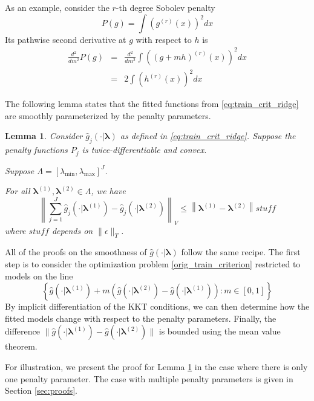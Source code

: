\documentclass[12pt]{article}
\newtheorem{lemma}{Lemma}
\begin{document}
As an example, consider the $r$-th degree Sobolev penalty
\begin{equation}
P(g) = \int \left(g^{(r)}(x) \right)^2 dx
\end{equation}
Its pathwise second derivative at $g$ with respect to $h$ is
\begin{eqnarray}
\frac{d^2}{dm^2} P(g) &=& \frac{d^2}{dm^2} \int \left((g + mh)^{(r)}(x) \right)^2 dx\\
&=& 2 \int \left(h^{(r)}(x) \right)^2 dx
\end{eqnarray}

The following lemma states that the fitted functions from \ref{eq:train_crit_ridge} are smoothly parameterized by the penalty parameters.

\begin{lemma}
\label{lemma:nonparam_smooth}
Consider $\hat{g}_{j}(\cdot| \boldsymbol \lambda)$ as defined in \ref{eq:train_crit_ridge}.
Suppose the penalty functions $P_{j}$ is twice-differentiable and convex.

Suppose $\Lambda = [\lambda_{\min}, \lambda_{\max}]^J$.

For all $\boldsymbol \lambda^{(1)}, \boldsymbol \lambda^{(2)} \in \Lambda$, we have
\[
\left \|
\sum_{j=1}^{J}\hat{g}_{j}(\cdot| \boldsymbol \lambda^{(1)})-\hat{g}_{j}(\cdot| \boldsymbol \lambda^{(2)})
\right \|_{V}
\le
\left \|
\boldsymbol \lambda^{(1)}- \boldsymbol \lambda^{(2)}
\right \|
stuff
\]
where $stuff$ depends on $\| \epsilon \|_T$.
\end{lemma}

All of the proofs on the smoothness of $\hat{g}(\cdot | \boldsymbol \lambda)$ follow the same recipe. The first step is to consider the optimization problem \eqref{orig_train_criterion} restricted to models on the line
\begin{equation}
\left \{ \hat{g}(\cdot |\boldsymbol \lambda^{(1)}) + m \left (\hat{g}(\cdot |\boldsymbol \lambda^{(2)})  - \hat{g}(\cdot |\boldsymbol \lambda^{(1)}) \right ) : m \in [0,1] \right \}
\end{equation}
By implicit differentiation of the KKT conditions, we can then determine how the fitted models change with respect to the penalty parameters. Finally, the difference $\| \hat{g}(\cdot | \boldsymbol \lambda^{(1)}) -  \hat{g}(\cdot | \boldsymbol \lambda^{(2)}) \|$ is bounded using the mean value theorem.

For illustration, we present the proof for Lemma \ref{lemma:nonparam_smooth} in the case where there is only one penalty parameter. The case with multiple penalty parameters is given in Section \ref{sec:proofs}.
\end{document}
